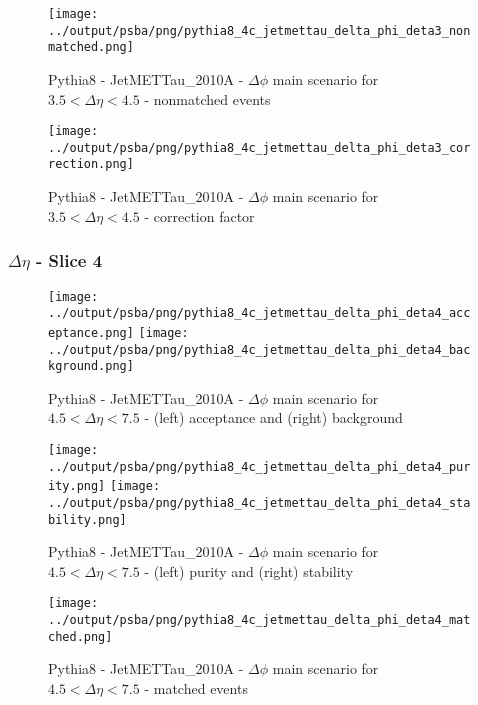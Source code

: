\documentclass[11pt]{book}
\begin{document}
\begin{figure}[ht]
\centering
\texttt{[image: ../output/psba/png/pythia8\_4c\_jetmettau\_delta\_phi\_deta3\_nonmatched.png]}
\caption{Pythia8 - JetMETTau\_2010A - $\Delta\phi$ main scenario for $3.5 < \Delta\eta < 4.5$ - nonmatched events}
\label{fig:p8_jetmettau_delta_phi_deta3_nonmatched}
\end{figure}

\begin{figure}[ht]
\centering
\texttt{[image: ../output/psba/png/pythia8\_4c\_jetmettau\_delta\_phi\_deta3\_correction.png]}
\caption{Pythia8 - JetMETTau\_2010A - $\Delta\phi$ main scenario for $3.5 < \Delta\eta < 4.5$ - correction factor}
\label{fig:p8_jetmettau_delta_phi_deta3_correction}
\end{figure}

\clearpage
\subsubsection{$\Delta\eta$ - Slice 4}

\begin{figure}[ht]
\centering
\texttt{[image: ../output/psba/png/pythia8\_4c\_jetmettau\_delta\_phi\_deta4\_acceptance.png]}
\texttt{[image: ../output/psba/png/pythia8\_4c\_jetmettau\_delta\_phi\_deta4\_background.png]}
\caption{Pythia8 - JetMETTau\_2010A - $\Delta\phi$ main scenario for $4.5 < \Delta\eta < 7.5$ - (left) acceptance and (right) background}
\label{fig:p8_jetmettau_delta_phi_deta4_ab}
\end{figure}

\begin{figure}[ht]
\centering
\texttt{[image: ../output/psba/png/pythia8\_4c\_jetmettau\_delta\_phi\_deta4\_purity.png]}
\texttt{[image: ../output/psba/png/pythia8\_4c\_jetmettau\_delta\_phi\_deta4\_stability.png]}
\caption{Pythia8 - JetMETTau\_2010A - $\Delta\phi$ main scenario for $4.5 < \Delta\eta < 7.5$ - (left) purity and (right) stability}
\label{fig:p8_jetmettau_delta_phi_deta4_ps}
\end{figure}

\begin{figure}[ht]
\centering
\texttt{[image: ../output/psba/png/pythia8\_4c\_jetmettau\_delta\_phi\_deta4\_matched.png]}
\caption{Pythia8 - JetMETTau\_2010A - $\Delta\phi$ main scenario for $4.5 < \Delta\eta < 7.5$ - matched events}
\label{fig:p8_jetmettau_delta_phi_deta4_matched}
\end{figure}
\end{document}
